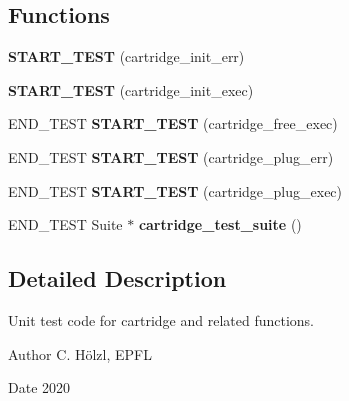 \subsection*{Functions}
\begin{DoxyCompactItemize}
\item 
\mbox{\label{unit-test-cartridge_8c_a1352ec4e7a02f681db8c928ce2748af9}} 
{\bfseries S\+T\+A\+R\+T\+\_\+\+T\+E\+ST} (cartridge\+\_\+init\+\_\+err)
\item 
\mbox{\label{unit-test-cartridge_8c_a5ab46445c2906b29d07579f70385f966}} 
{\bfseries S\+T\+A\+R\+T\+\_\+\+T\+E\+ST} (cartridge\+\_\+init\+\_\+exec)
\item 
\mbox{\label{unit-test-cartridge_8c_a90e07300d556edd582158118cb4cf65a}} 
E\+N\+D\+\_\+\+T\+E\+ST {\bfseries S\+T\+A\+R\+T\+\_\+\+T\+E\+ST} (cartridge\+\_\+free\+\_\+exec)
\item 
\mbox{\label{unit-test-cartridge_8c_a1eb7cb1da97dbb2a5f3223372d96a4f9}} 
E\+N\+D\+\_\+\+T\+E\+ST {\bfseries S\+T\+A\+R\+T\+\_\+\+T\+E\+ST} (cartridge\+\_\+plug\+\_\+err)
\item 
\mbox{\label{unit-test-cartridge_8c_ae3f06b2efd9629a389549e17c45bffe5}} 
E\+N\+D\+\_\+\+T\+E\+ST {\bfseries S\+T\+A\+R\+T\+\_\+\+T\+E\+ST} (cartridge\+\_\+plug\+\_\+exec)
\item 
\mbox{\label{unit-test-cartridge_8c_ae9bf8497ac3c350f625969edfe7ca4df}} 
E\+N\+D\+\_\+\+T\+E\+ST Suite $\ast$ {\bfseries cartridge\+\_\+test\+\_\+suite} ()
\end{DoxyCompactItemize}


\subsection{Detailed Description}
Unit test code for cartridge and related functions. 

\begin{DoxyAuthor}{Author}
C. Hölzl, E\+P\+FL 
\end{DoxyAuthor}
\begin{DoxyDate}{Date}
2020 
\end{DoxyDate}


